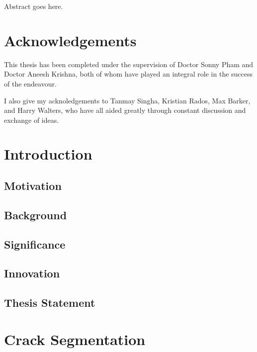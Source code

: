 \documentclass[a4paper,12pt]{report}
\begin{document}
Abstract goes here. 

\newpage
\chapter*{Acknowledgements}
This thesis has been completed under the supervision of Doctor Sonny Pham and Doctor Aneesh Krishna, both of whom have played an integral role in the success of the endeavour.

\noindent I also give my acknoledgements to Tanmay Singha, Kristian Rados, Max Barker, and Harry Walters, who have all aided greatly through constant discussion and exchange of ideas.

\newpage
\tableofcontents
\newpage
\listoffigures
\newpage
\listoftables
\newpage
\thispagestyle{empty}

\chapter{Introduction}

\section{Motivation}

\section{Background}

\section{Significance}

\section{Innovation}

\section{Thesis Statement}

\chapter{Crack Segmentation}
\end{document}
